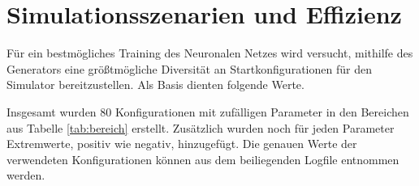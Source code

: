 \chapter{Simulationsszenarien und Effizienz}

Für ein bestmögliches Training des Neuronalen Netzes wird versucht, mithilfe des Generators eine größtmögliche Diversität an Startkonfigurationen für den Simulator bereitzustellen. Als Basis dienten folgende Werte.


Insgesamt wurden 80 Konfigurationen mit zufälligen Parameter in den Bereichen aus Tabelle \ref{tab:bereich} erstellt. Zusätzlich wurden noch für jeden Parameter Extremwerte, positiv wie negativ, hinzugefügt. Die genauen Werte der verwendeten Konfigurationen können aus dem beiliegenden Logfile entnommen werden.